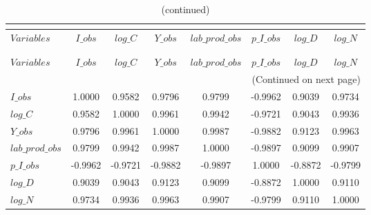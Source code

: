  
\begin{center}
\begin{longtable}{lccccccc} 
\caption{MATRIX OF CORRELATIONS}\\
 \label{Table:th_corr_matrix}\\
\toprule 
$Variables       $	 & 	 $           I\_obs$	 & 	 $           log\_C$	 & 	 $           Y\_obs$	 & 	 $  lab\_prod\_obs$	 & 	 $       p\_I\_obs$	 & 	 $           log\_D$	 & 	 $           log\_N$\\
\midrule \endfirsthead 
\caption{(continued)}\\
 \toprule \\ 
$Variables       $	 & 	 $           I\_obs$	 & 	 $           log\_C$	 & 	 $           Y\_obs$	 & 	 $  lab\_prod\_obs$	 & 	 $       p\_I\_obs$	 & 	 $           log\_D$	 & 	 $           log\_N$\\
\midrule \endhead 
\midrule \multicolumn{8}{r}{(Continued on next page)} \\ \bottomrule \endfoot 
\bottomrule \endlastfoot 
$I\_obs          $	 & 	            1.0000	 & 	            0.9582	 & 	            0.9796	 & 	            0.9799	 & 	           -0.9962	 & 	            0.9039	 & 	            0.9734 \\ 
$log\_C          $	 & 	            0.9582	 & 	            1.0000	 & 	            0.9961	 & 	            0.9942	 & 	           -0.9721	 & 	            0.9043	 & 	            0.9936 \\ 
$Y\_obs          $	 & 	            0.9796	 & 	            0.9961	 & 	            1.0000	 & 	            0.9987	 & 	           -0.9882	 & 	            0.9123	 & 	            0.9963 \\ 
$lab\_prod\_obs  $	 & 	            0.9799	 & 	            0.9942	 & 	            0.9987	 & 	            1.0000	 & 	           -0.9897	 & 	            0.9099	 & 	            0.9907 \\ 
$p\_I\_obs       $	 & 	           -0.9962	 & 	           -0.9721	 & 	           -0.9882	 & 	           -0.9897	 & 	            1.0000	 & 	           -0.8872	 & 	           -0.9799 \\ 
$log\_D          $	 & 	            0.9039	 & 	            0.9043	 & 	            0.9123	 & 	            0.9099	 & 	           -0.8872	 & 	            1.0000	 & 	            0.9110 \\ 
$log\_N          $	 & 	            0.9734	 & 	            0.9936	 & 	            0.9963	 & 	            0.9907	 & 	           -0.9799	 & 	            0.9110	 & 	            1.0000 \\ 
\end{longtable}
 \end{center}
